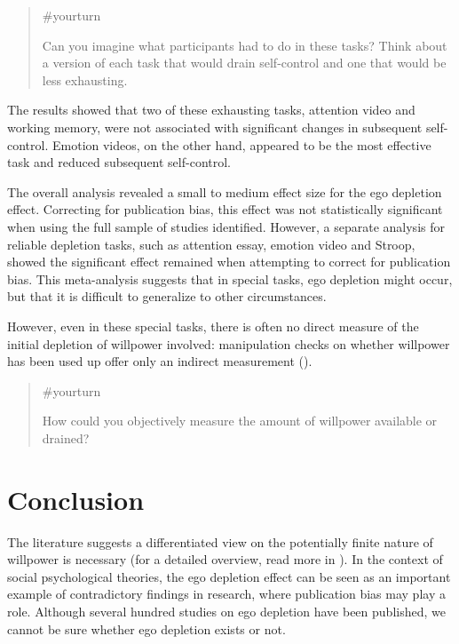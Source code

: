 \documentclass[
  letterpaper,
]{book}
\begin{document}
\begin{quote}
{\#yourturn}

Can you imagine what participants had to do in these tasks? Think about
a version of each task that would drain self-control and one that would
be less exhausting.
\end{quote}

The results showed that two of these exhausting tasks, attention video
and working memory, were not associated with significant changes in
subsequent self-control. Emotion videos, on the other hand, appeared to
be the most effective task and reduced subsequent self-control.

The overall analysis revealed a small to medium effect size for the ego
depletion effect. Correcting for publication bias, this effect was not
statistically significant when using the full sample of studies
identified. However, a separate analysis for reliable depletion tasks,
such as attention essay, emotion video and Stroop, showed the
significant effect remained when attempting to correct for publication
bias. This meta-analysis suggests that in special tasks, ego depletion
might occur, but that it is difficult to generalize to other
circumstances.

However, even in these special tasks, there is often no direct measure
of the initial depletion of willpower involved: manipulation checks on
whether willpower has been used up offer only an indirect measurement
().

\begin{quote}
{\#yourturn}

How could you objectively measure the amount of willpower available or
drained?
\end{quote}

\section{Conclusion}\label{conclusion-4}

The literature suggests a differentiated view on the potentially finite
nature of willpower is necessary (for a detailed overview, read more in
). In the context of
social psychological theories, the ego depletion effect can be seen as
an important example of contradictory findings in research, where
publication bias may play a role. Although several hundred studies on
ego depletion have been published, we cannot be sure whether ego
depletion exists or not.
\end{document}
